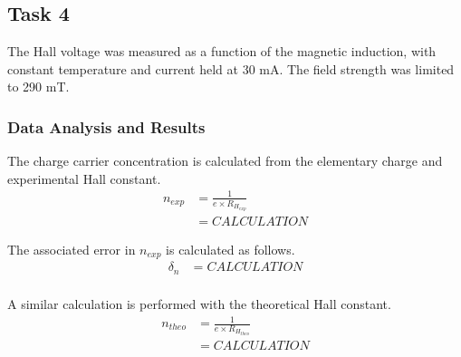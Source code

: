 \documentclass[a4paper]{article}
\begin{document}
\subsection{Task 4}

\qq The Hall voltage was measured as a function of the magnetic
induction, with constant temperature and current held at 30 mA. 
The field strength was limited to 290 mT. 

\subsubsection{Data Analysis and Results}

\begin{figure}[H]
\centering
\label{task34plot}
\end{figure}




The charge carrier concentration is calculated from the elementary charge and experimental Hall constant.
\begin{align*}
n_{exp} &= \frac{1}{e \times R_{H_{exp}}} \\
	&= CALCULATION 
\end{align*}

The associated error in $n_{exp}$ is calculated as follows.
\begin{align*}
\delta_n &= CALCULATION \\
\end{align*}

A similar calculation is performed with the theoretical Hall constant.
\begin{align*}
n_{theo} &= \frac{1}{e \times R_{H_{theo}}} \\
	&= CALCULATION \\
\end{align*}
\end{document}
